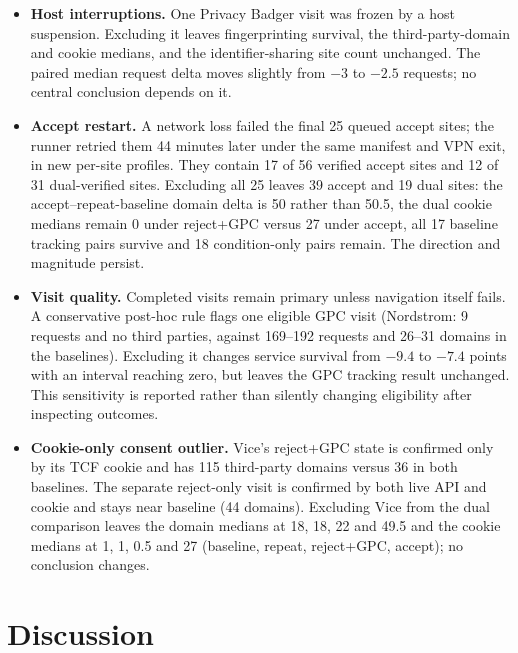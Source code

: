 \documentclass[sigconf,review,anonymous]{acmart}
\begin{document}
\begin{itemize}
  reach the crawler. Re-assigning each call by its own timestamp moves 0.9\% of calls and changes
  0 to 5 post-consent pairs per condition. It changes no tracking pair on a site with a verified
  choice.
\item \textbf{Host interruptions.} One Privacy Badger visit was frozen by a host suspension.
  Excluding it leaves fingerprinting survival, the third-party-domain and cookie medians, and
  the identifier-sharing site count unchanged. The paired median request delta moves slightly
  from $-3$ to $-2.5$ requests; no central conclusion depends on it.
\item \textbf{Accept restart.} A network loss failed the final 25 queued accept sites; the runner
  retried them 44 minutes later under the same manifest and VPN exit, in new per-site profiles.
  They contain 17 of 56 verified accept sites and 12 of 31 dual-verified sites. Excluding all 25
  leaves 39 accept and 19 dual sites: the accept--repeat-baseline domain delta is 50 rather than
  50.5, the dual cookie medians remain 0 under reject+GPC versus 27 under accept, all 17 baseline
  tracking pairs survive and 18 condition-only pairs remain. The direction and magnitude persist.
\item \textbf{Visit quality.} Completed visits remain primary unless navigation itself fails.
  A conservative post-hoc rule flags one eligible GPC visit (Nordstrom: 9 requests and no third
  parties, against 169--192 requests and 26--31 domains in the baselines). Excluding it changes
  service survival from $-9.4$ to $-7.4$ points with an interval reaching zero, but leaves the
  GPC tracking result unchanged. This sensitivity is reported rather than silently changing
  eligibility after inspecting outcomes.
\item \textbf{Cookie-only consent outlier.} Vice's reject+GPC state is confirmed only by its TCF
  cookie and has 115 third-party domains versus 36 in both baselines. The separate reject-only
  visit is confirmed by both live API and cookie and stays near baseline (44 domains). Excluding
  Vice from the dual comparison leaves the domain medians at 18, 18, 22 and 49.5 and the cookie
  medians at 1, 1, 0.5 and 27 (baseline, repeat, reject+GPC, accept); no conclusion changes.
\end{itemize}

\section{Discussion}
\end{document}
